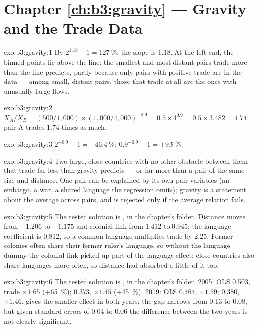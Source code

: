 \section*{Chapter \ref{ch:b3:gravity} --- Gravity and the Trade Data}

\begin{solution}{exo:b3:gravity:1}
By $2^{1.18} - 1 = 127~\%$: the slope is 1.18. %
At the left end, the binned points lie above the line: the smallest and most
distant pairs trade more than the line predicts, partly because only pairs with
positive trade are in the data --- among small, distant pairs, those that trade at
all are the ones with unusually large flows.
\end{solution}

\begin{solution}{exo:b3:gravity:2}
$X_A/X_B = (500/1{,}000) \times (1{,}000/4{,}000)^{-0.9} = 0.5 \times 4^{0.9} = 0.5 \times 3.482 = 1.74$:
pair A trades 1.74 times as much.
\end{solution}

\begin{solution}{exo:b3:gravity:3}
$2^{-0.9} - 1 = -46.4~\%$; $0.9^{-0.9} - 1 = +9.9~\%$.
\end{solution}

\begin{solution}{exo:b3:gravity:4}
Two large, close countries with no other obstacle between them that trade far
less than gravity predicts --- or far more than a pair of the same size and
distance. One pair can be explained by its own pair variables (an embargo, a war,
a shared language the regression omits); gravity is a statement about the
average across pairs, and is rejected only if the average relation fails.
\end{solution}

\begin{solution}{exo:b3:gravity:5}
The tested solution is , in the chapter's 
folder. Distance moves from $-1.206$ to $-1.175$ and colonial link from 1.412 to 0.945;
the language coefficient is 0.812, so a common language multiplies trade by 2.25.
Former colonies often share their former ruler's language, so without the
language dummy the colonial link picked up part of the language effect; close
countries also share languages more often, so distance had absorbed a little of
it too.
\end{solution}

\begin{solution}{exo:b3:gravity:6}
The tested solution is , in the chapter's 
folder. 2005: OLS 0.503, trade $\times 1.65$ (+65~\%);  0.373, $\times 1.45$ (+45~\%). 2019:
OLS 0.464, $\times 1.59$;  0.380, $\times 1.46$. %
 gives the smaller effect in both years; the gap narrows from 0.13 to 0.08,
but given standard errors of 0.04 to 0.06 the difference between the two years is
not clearly significant.
\end{solution}

